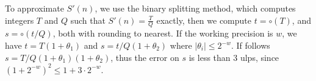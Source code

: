 \documentclass[12pt]{amsart}
\def\q{\hspace*{5mm}}
\def\ulp{{\rm ulp}}
\begin{document}
To approximate $S'(n)$, we use the binary splitting method,
which computes
integers $T$ and $Q$ such that $S'(n) = \frac{T}{Q}$ exactly, then we
compute $t = \circ(T)$, and $s = \circ(t/Q)$, both with rounding to nearest.
If the working precision is $w$,
we have $t = T (1+\theta_1)$ and $s = t/Q(1+\theta_2)$ where
$|\theta_i| \leq 2^{-w}$.
If follows $s = T/Q (1+\theta_1)(1+\theta_2)$, thus the error on $s$
is less than $3$ ulps, since $(1+2^{-w})^2 \leq 1 + 3 \cdot 2^{-w}$.
\begin{comment}
To approximate $S'(n)$, we use the following algorithm, where $m$ is the
working precision, and $a, s, t$ are integer variables:
\begin{quote}
$a \leftarrow 2^m$ \\
$s \leftarrow 0$ \\
{\bf for} $k$ {\bf from} $1$ {\bf to} $N$ {\bf do} \\
\q $a \leftarrow \lfloor \frac{n a}{k} \rfloor$ \\
\q $t \leftarrow \lfloor \frac{a}{k} \rfloor$ \\
\q $s \leftarrow s + (-1)^{k-1} t$ \\
return $x = s/2^m$
\end{quote}
The absolute error $\epsilon_k$ on $a$ at step $k$ satisfies
$\epsilon_k \le 1 + n/k \epsilon_{k-1}$ with $\epsilon_0=0$.
The maximum error is $\epsilon_n \le \frac{n^n}{n!} \le e^n$.
Thus the error on $t$ at step $k$ is less than $1 + e^n/k$,
and the total error on $s$ is bounded by $N (e^n + 1)$.
Hence to get a precision of $n$ bits, we need to use
$m \ge n (1 + \frac{1}{\log 2})$.
In such a case, the value $s/2^m$ converted to a floating-point number
will have an error of at most $\ulp(x)$.
\end{comment}

\medskip
\end{document}
